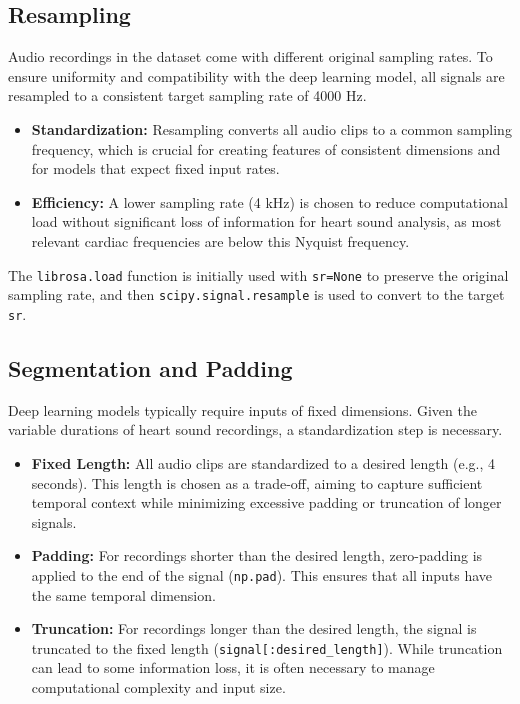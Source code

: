 \documentclass[a4paper]{article}
\begin{document}
\begin{multicols}{2}
\subsection{Resampling}
Audio recordings in the dataset come with different original sampling rates. To ensure uniformity and compatibility with the deep learning model, all signals are resampled to a consistent target sampling rate of 4000 Hz.
\begin{itemize}
    \item \textbf{Standardization:} Resampling converts all audio clips to a common sampling frequency, which is crucial for creating features of consistent dimensions and for models that expect fixed input rates.
    \item \textbf{Efficiency:} A lower sampling rate (4 kHz) is chosen to reduce computational load without significant loss of information for heart sound analysis, as most relevant cardiac frequencies are below this Nyquist frequency.
\end{itemize}
The \texttt{librosa.load} function is initially used with \texttt{sr=None} to preserve the original sampling rate, and then \texttt{scipy.signal.resample} is used to convert to the target \texttt{sr}.

\subsection{Segmentation and Padding}
Deep learning models typically require inputs of fixed dimensions. Given the variable durations of heart sound recordings, a standardization step is necessary.
\begin{itemize}
    \item \textbf{Fixed Length:} All audio clips are standardized to a desired length (e.g., 4 seconds). This length is chosen as a trade-off, aiming to capture sufficient temporal context while minimizing excessive padding or truncation of longer signals.
    \item \textbf{Padding:} For recordings shorter than the desired length, zero-padding is applied to the end of the signal (\texttt{np.pad}). This ensures that all inputs have the same temporal dimension.
    \item \textbf{Truncation:} For recordings longer than the desired length, the signal is truncated to the fixed length (\texttt{signal[:desired\_length]}). While truncation can lead to some information loss, it is often necessary to manage computational complexity and input size.
\end{itemize}


\end{multicols}
\end{document}

